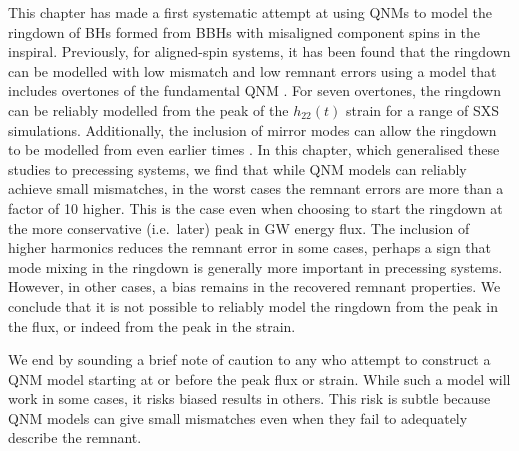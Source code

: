This chapter has made a first systematic attempt at using QNMs to model the ringdown of BHs formed from BBHs with misaligned component spins in the inspiral.
Previously, for aligned-spin systems, it has been found that the ringdown can be modelled with low mismatch and low remnant errors using a model that includes overtones of the fundamental QNM \cite{Giesler:2019uxc}. For seven overtones, the ringdown can be reliably modelled from the peak of the $h_{22}(t)$ strain for a range of SXS simulations.
Additionally, the inclusion of mirror modes can allow the ringdown to be modelled from even earlier times \cite{Dhani:2020nik}.
In this chapter, which generalised these studies to precessing systems, we find that while QNM models can reliably achieve small mismatches, in the worst cases the remnant errors are more than a factor of 10 higher.
This is the case even when choosing to start the ringdown at the more conservative (i.e.\ later) peak in GW energy flux. 
The inclusion of higher harmonics reduces the remnant error in some cases, perhaps a sign that mode mixing in the ringdown is generally more important in precessing systems. However, in other cases, a bias remains in the recovered remnant properties.
We conclude that it is not possible to reliably model the ringdown from the peak in the flux, or indeed from the peak in the strain. 

We end by sounding a brief note of caution to any who attempt to construct a QNM model starting at or before the peak flux or strain. 
While such a model will work in some cases, it risks biased results in others. 
This risk is subtle because QNM models can give small mismatches even when they fail to adequately describe the remnant.




